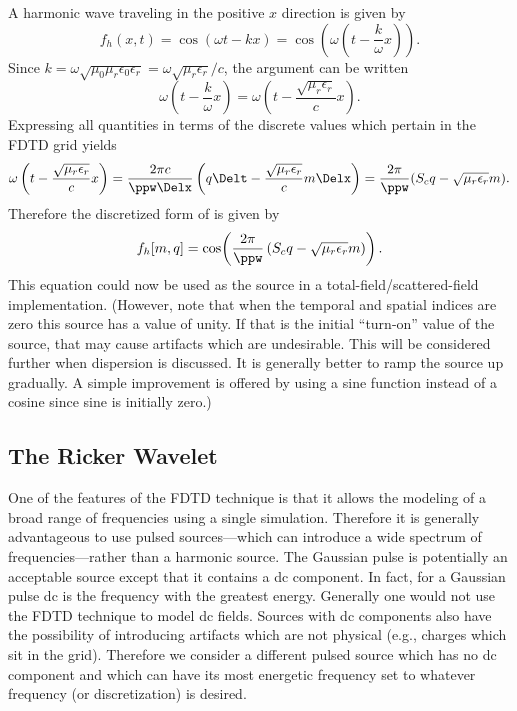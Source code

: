 A harmonic wave traveling in the positive $x$ direction is given by
\begin{equation}
  f_h(x,t) = \cos(\omega t - k x) = 
  \cos\!\left(\omega\left(t - \frac{k}{\omega} x\right)\right).
  \label{eq:harmonicTravel}
\end{equation}
Since $k=\omega\sqrt{\mu_0\mu_r\epsilon_0\epsilon_r}=
\omega\sqrt{\mu_r\epsilon_r}/c$, the argument can be written
\begin{equation}
  \omega\left(t - \frac{k}{\omega} x\right) =
  \omega\left(t - \frac{\sqrt{\mu_r\epsilon_r}}{c} x\right).
\end{equation}
Expressing all quantities in terms of the discrete values which
pertain in the FDTD grid yields
\begin{equation}
  \omega\left(t - \frac{\sqrt{\mu_r\epsilon_r}}{c} x\right) =
    \frac{2\pi c}{\ppw\Delx}
    \left(q\Delt - \frac{\sqrt{\mu_r\epsilon_r}}{c} m\Delx\right) =
        \frac{2\pi}{\ppw}(S_c q - \sqrt{\mu_r\epsilon_r}m).
\end{equation}
Therefore the discretized form of  is given
by
\begin{equation}
  f_h[m,q] =
    \cos\!\left(\frac{2\pi}{\ppw}
                \left(S_c q-\sqrt{\mu_r\epsilon_r}m\right)\right).
\end{equation}
This equation could now be used as the source in a
total-field/scattered-field implementation.  (However, note that when
the temporal and spatial indices are zero this source has a value of
unity.  If that is the initial ``turn-on'' value of the source, that
may cause artifacts which are undesirable.  This will be considered
further when dispersion is discussed.  It is generally better to ramp
the source up gradually.  A simple improvement is offered by using a
sine function instead of a cosine since sine is initially zero.)

\subsection{The Ricker Wavelet \label{sec:ricker}}

One of the features of the FDTD technique is that it allows the
modeling of a broad range of frequencies using a single simulation.
Therefore it is generally advantageous to use pulsed sources---which
can introduce a wide spectrum of frequencies---rather than a harmonic
source.  The Gaussian pulse is potentially an acceptable source except
that it contains a dc component.  In fact, for a Gaussian pulse dc is
the frequency with the greatest energy.  Generally one would not use
the FDTD technique to model dc fields.  Sources with dc components
also have the possibility of introducing artifacts which are not
physical (e.g., charges which sit in the grid).  Therefore we consider
a different pulsed source which has no dc component and which can have
its most energetic frequency set to whatever frequency (or
discretization) is desired.

